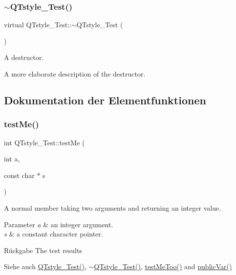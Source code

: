 \subsubsection{\texorpdfstring{$\sim$\+Q\+Tstyle\+\_\+\+Test()}{~QTstyle\_Test()}}
{\footnotesize\ttfamily virtual Q\+Tstyle\+\_\+\+Test\+::$\sim$\+Q\+Tstyle\+\_\+\+Test (\begin{DoxyParamCaption}{ }\end{DoxyParamCaption})\hspace{0.3cm}{\ttfamily [virtual]}}



A destructor. 

A more elaborate description of the destructor. 

\subsection{Dokumentation der Elementfunktionen}
\mbox{\label{class_q_tstyle___test_a8840748753118dd468e8368a28e49c62}} 
\subsubsection{\texorpdfstring{test\+Me()}{testMe()}}
{\footnotesize\ttfamily int Q\+Tstyle\+\_\+\+Test\+::test\+Me (\begin{DoxyParamCaption}\item[{int}]{a,  }\item[{const char $\ast$}]{s }\end{DoxyParamCaption})}



A normal member taking two arguments and returning an integer value. 


\begin{DoxyParams}{Parameter}
{\em a} & an integer argument. \\
\hline
{\em s} & a constant character pointer. \\
\hline
\end{DoxyParams}
\begin{DoxyReturn}{Rückgabe}
The test results 
\end{DoxyReturn}
\begin{DoxySeeAlso}{Siehe auch}
\hyperlink{class_q_tstyle___test_a14a296ea4e2ad446712f2310bec60766}{Q\+Tstyle\+\_\+\+Test()}, \hyperlink{class_q_tstyle___test_a0ad2e372fe09f34fce46b570b297ae79}{$\sim$\+Q\+Tstyle\+\_\+\+Test()}, \hyperlink{class_q_tstyle___test_ad5b201f097a720d44bf976c2f27efbda}{test\+Me\+Too()} and \hyperlink{class_q_tstyle___test_aabf7b2e9ed83ea44aca4d213baae06d3}{public\+Var()} 
\end{DoxySeeAlso}
\mbox{\label{class_q_tstyle___test_ad5b201f097a720d44bf976c2f27efbda}} 
